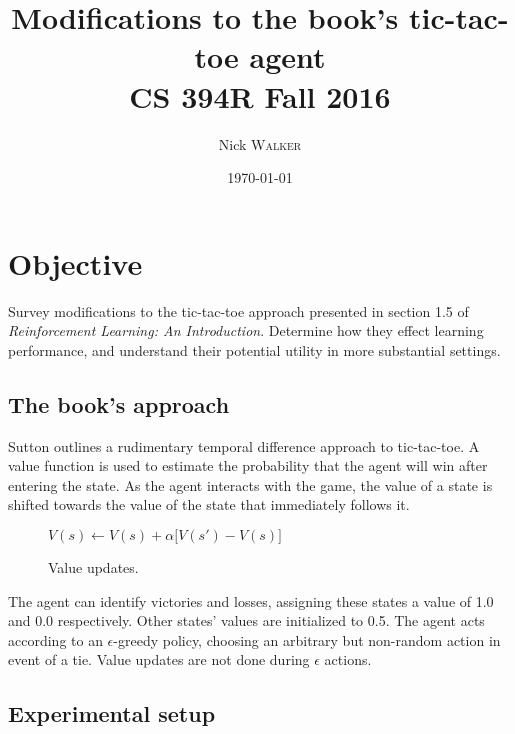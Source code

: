 \documentclass{article}
\title{Modifications to the book's tic-tac-toe agent \\ CS 394R Fall 2016} %
\author{Nick \textsc{Walker}} %
\date{\today} %
\begin{document}
	
	\maketitle %
	
	
	
	\section{Objective}
	
	Survey modifications to the tic-tac-toe approach presented in section 1.5 of \textit{Reinforcement Learning: An Introduction}. Determine how they effect learning performance, and understand their potential utility in more substantial settings.
	
	\begin{center}\end{center}

	
	\subsection{The book's approach}
	
	Sutton outlines a rudimentary temporal difference approach to tic-tac-toe. A value function is used to estimate the probability that the agent will win after entering the state. As the agent interacts with the game, the value of a state is shifted towards the value of the state that immediately follows it.
	
	\begin{figure}[h]
		\begin{center}
			$\mathit{V(s) \leftarrow V(s) + \alpha \big[V(s') - V(s)\big]}$
			\caption{Value updates.}
		\end{center}
	\end{figure}
	
	The agent can identify victories and losses, assigning these states a value of 1.0 and 0.0 respectively. Other states' values are initialized to 0.5. The agent acts according to an $\epsilon$-greedy policy, choosing an arbitrary but non-random action in event of a tie. Value updates are not done during $\epsilon$ actions.
	
	\subsection{Experimental setup}
	
\end{document}
